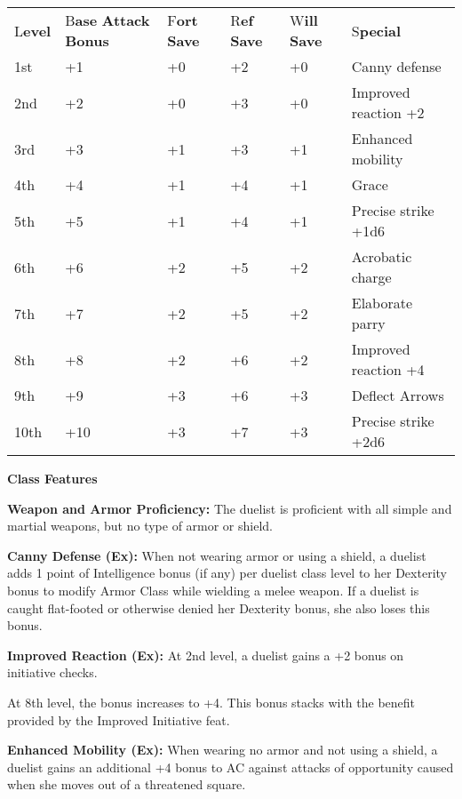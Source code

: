 \documentclass{article}
\begin{document}
\vspace{12pt}
\parindent=0pt
\begin{tabular}{|>{\raggedright}p{22pt}|>{\raggedright}p{33pt}|>{\raggedright}p{23pt}|>{\raggedright}p{23pt}|>{\raggedright}p{23pt}|>{\raggedright}p{90pt}|}
\hline
\multicolumn{6}{|p{215pt}|}{T\textbf{able: The Duelist}}\tabularnewline
\hline
L\textbf{evel} & B\textbf{ase}\linebreak{}
\textbf{Attack}\linebreak{}
\textbf{Bonus} & F\textbf{ort}\linebreak{}
\textbf{Save} & R\textbf{ef}\linebreak{}
\textbf{Save} & W\textbf{ill}\linebreak{}
\textbf{Save} & S\textbf{pecial}\tabularnewline
\hline
1st & +1 & +0 & +2 & +0 & Canny defense\tabularnewline
\hline
2nd & +2 & +0 & +3 & +0 & Improved reaction +2\tabularnewline
\hline
3rd & +3 & +1 & +3 & +1 & Enhanced mobility\tabularnewline
\hline
4th & +4 & +1 & +4 & +1 & Grace\tabularnewline
\hline
5th & +5 & +1 & +4 & +1 & Precise strike +1d6\tabularnewline
\hline
6th & +6 & +2 & +5 & +2 & Acrobatic charge\tabularnewline
\hline
7th & +7 & +2 & +5 & +2 & Elaborate parry\tabularnewline
\hline
8th & +8 & +2 & +6 & +2 & Improved reaction +4\tabularnewline
\hline
9th & +9 & +3 & +6 & +3 & Deflect Arrows\tabularnewline
\hline
10th & +10 & +3 & +7 & +3 & Precise strike +2d6\tabularnewline
\hline
\end{tabular}

\vspace{12pt}
\textbf{Class Features}

\textbf{Weapon and Armor Proficiency:} The duelist is proficient with all simple 
and martial weapons, but no type of armor or shield.

\textbf{Canny Defense (Ex):} When not wearing armor or using a shield, a duelist 
adds 1 point of Intelligence bonus (if any) per duelist class level to her Dexterity 
bonus to modify Armor Class while wielding a melee weapon. If a duelist is caught 
flat-footed or otherwise denied her Dexterity bonus, she also loses this bonus.

\textbf{Improved Reaction (Ex):} At 2nd level, a duelist gains a +2 bonus on initiative 
checks.

At 8th level, the bonus increases to +4. This bonus stacks with the benefit provided 
by the Improved Initiative feat.

\textbf{Enhanced Mobility (Ex):} When wearing no armor and not using a shield, 
a duelist gains an additional +4 bonus to AC against attacks of opportunity caused 
when she moves out of a threatened square.
\end{document}
